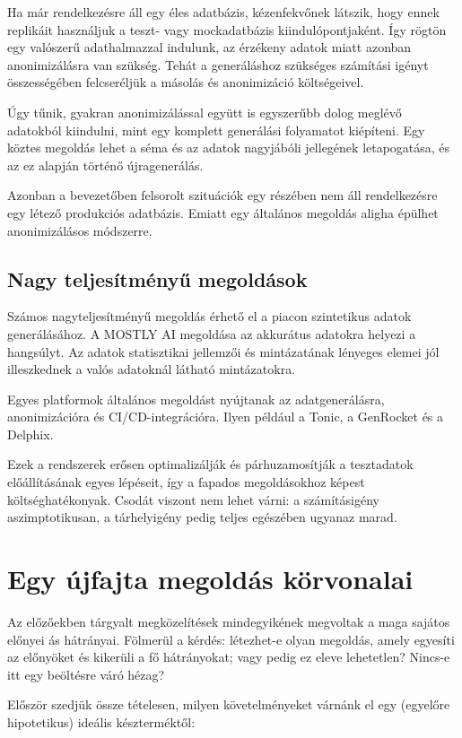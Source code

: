 \documentclass[
    parspace,
    noindent,
    nohyp,
]{elteiktdk}[2023/04/10]
\begin{document}
Ha már rendelkezésre áll egy éles adatbázis, kézenfekvőnek látszik,
hogy ennek replikáit használjuk a teszt- vagy mockadatbázis kiindulópontjaként.
Így rögtön egy valószerű adathalmazzal indulunk,
az érzékeny adatok miatt azonban anonimizálásra van szükség.
Tehát a generáláshoz szükséges számítási igényt összességében
felcseréljük a másolás és anonimizáció költségeivel.

Úgy tűnik, gyakran anonimizálással együtt is egyszerűbb dolog meglévő adatokból kiindulni,
mint egy komplett generálási folyamatot kiépíteni.
Egy köztes megoldás lehet a séma és az adatok nagyjábóli jellegének letapogatása,
és az ez alapján történő újragenerálás.

Azonban a bevezetőben felsorolt szituációk egy részében nem áll rendelkezésre egy létező produkciós adatbázis.
Emiatt egy általános megoldás aligha épülhet anonimizálásos módszerre.

\subsection{Nagy teljesítményű megoldások}

Számos nagyteljesítményű megoldás érhető el a piacon szintetikus adatok generálásához.
A MOSTLY AI megoldása az akkurátus adatokra helyezi a hangsúlyt.
Az adatok statisztikai jellemzői és mintázatának lényeges elemei
jól illeszkednek a valós adatoknál látható mintázatokra.

Egyes platformok általános megoldást nyújtanak az adatgenerálásra, anonimizációra és CI/CD-integrációra.
Ilyen például a Tonic, a GenRocket és a Delphix.

Ezek a rendszerek erősen optimalizálják és párhuzamosítják a tesztadatok előállításának egyes lépéseit,
így a fapados megoldásokhoz képest költséghatékonyak.
Csodát viszont nem lehet várni: a számításigény aszimptotikusan,
a tárhelyigény pedig teljes egészében ugyanaz marad.


\section{Egy újfajta megoldás körvonalai}

Az előzőekben tárgyalt megközelítések mindegyikének megvoltak a maga sajátos előnyei ás hátrányai.
Fölmerül a kérdés: létezhet-e olyan megoldás, amely egyesíti az előnyöket és kikerüli a fő hátrányokat;
vagy pedig ez eleve lehetetlen?
Nincs-e itt egy beöltésre váró hézag?

Először szedjük össze tételesen, milyen követelményeket várnánk el
egy (egyelőre hipotetikus) ideális készterméktől:
\end{document}
